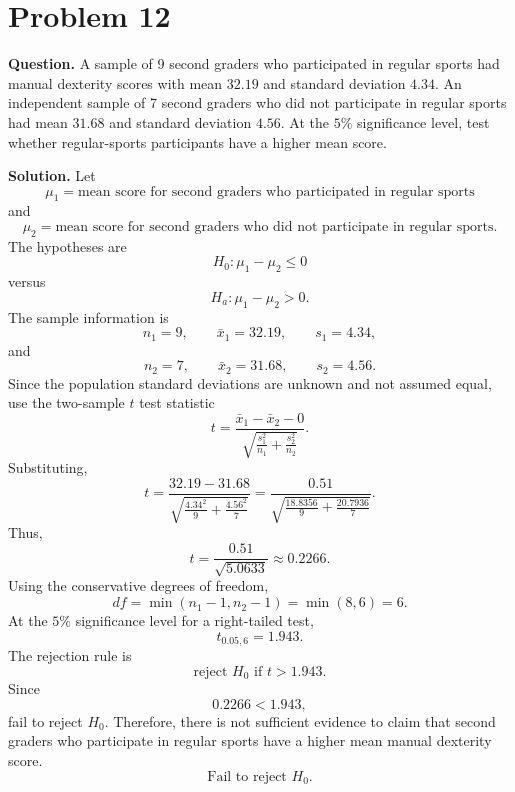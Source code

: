 \documentclass[11pt]{article}
\begin{document}
\section*{Problem 12}

\textbf{Question.} A sample of 9 second graders who participated in regular sports had manual dexterity scores with mean $32.19$ and standard deviation $4.34$. An independent sample of 7 second graders who did not participate in regular sports had mean $31.68$ and standard deviation $4.56$. At the $5\%$ significance level, test whether regular-sports participants have a higher mean score.

\textbf{Solution.} Let
\[
\mu_1=\text{mean score for second graders who participated in regular sports}
\]
and
\[
\mu_2=\text{mean score for second graders who did not participate in regular sports}.
\]
The hypotheses are
\[
H_0:\mu_1-\mu_2\le 0
\]
versus
\[
H_a:\mu_1-\mu_2>0.
\]
The sample information is
\[
n_1=9,\qquad \bar x_1=32.19,\qquad s_1=4.34,
\]
and
\[
n_2=7,\qquad \bar x_2=31.68,\qquad s_2=4.56.
\]
Since the population standard deviations are unknown and not assumed equal, use the two-sample $t$ test statistic
\[
t=\frac{\bar x_1-\bar x_2-0}{\sqrt{\frac{s_1^2}{n_1}+\frac{s_2^2}{n_2}}}.
\]
Substituting,
\[
t=\frac{32.19-31.68}{\sqrt{\frac{4.34^2}{9}+\frac{4.56^2}{7}}}
=\frac{0.51}{\sqrt{\frac{18.8356}{9}+\frac{20.7936}{7}}}.
\]
Thus,
\[
t=\frac{0.51}{\sqrt{5.0633}}\approx 0.2266.
\]
Using the conservative degrees of freedom,
\[
df=\min(n_1-1,n_2-1)=\min(8,6)=6.
\]
At the $5\%$ significance level for a right-tailed test,
\[
t_{0.05,6}=1.943.
\]
The rejection rule is
\[
\text{reject }H_0\text{ if }t>1.943.
\]
Since
\[
0.2266<1.943,
\]
fail to reject $H_0$. Therefore, there is not sufficient evidence to claim that second graders who participate in regular sports have a higher mean manual dexterity score.
\[
\boxed{\text{Fail to reject }H_0.}
\]

\newpage
\end{document}
